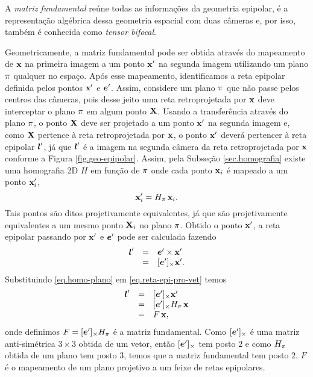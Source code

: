 A \textit{matriz fundamental} reúne todas as informações da geometria epipolar, é a representação algébrica dessa geometria espacial com duas câmeras e, por isso, também é conhecida como \textit{tensor bifocal}. 

Geometricamente, a matriz fundamental pode ser obtida através do mapeamento de $\mathbf{x}$ na primeira imagem a um ponto $\mathbf{x}'$ na segunda imagem utilizando um plano $\pi$ qualquer no espaço. Após esse mapeamento, identificamos a reta epipolar definida pelos pontos $\mathbf{x}'$ e $\boldsymbol{e}'$. Assim, considere um plano $\pi$ que não passe pelos centros das câmeras, pois desse jeito uma reta retroprojetada por $\mathbf{x}$ deve interceptar o plano $\pi$ em algum ponto $\mathbf{X}$. Usando a transferência através do plano $\pi$, o ponto $\mathbf{X}$ deve ser projetado a um ponto $\mathbf{x}'$ na segunda imagem e, como $\mathbf{X}$ pertence à reta retroprojetada por $\mathbf{x}$, o ponto $\mathbf{x}'$ deverá pertencer à reta epipolar $\boldsymbol{l}'$, já que $\boldsymbol{l}'$ é a imagem na segunda câmera da reta retroprojetada por $\mathbf{x}$ conforme a Figura \ref{fig.geo-epipolar}. Assim, pela Subseção \ref{sec.homografia} existe uma homografia 2D $H$ em função de $\pi$ onde cada ponto $\mathbf{x}_i$ é mapeado a um ponto $\mathbf{x}_i'$, 
\begin{equation}\label{eq.homo-plano}
\mathbf{x}'_i= H_{\pi} \,\mathbf{x}_i.
\end{equation}
Tais pontos são ditos projetivamente equivalentes, já que são projetivamente equivalentes a um mesmo ponto $\mathbf{X}_i$ no plano $\pi$. Obtido o ponto $\mathbf{x}'$, a reta epipolar passando por $\mathbf{x}'$ e $\boldsymbol{e}'$ pode ser calculada fazendo 
\begin{equation}\label{eq.reta-epi-pro-vet}
\begin{array}{rcl}
\boldsymbol{l}'&=&\boldsymbol{e}'\times\mathbf{x}'\\
&=&[\boldsymbol{e}']_\times\mathbf{x}'.
\end{array}
\end{equation}
Substituindo \ref{eq.homo-plano} em \ref{eq.reta-epi-pro-vet} temos
\begin{equation*}
\begin{array}{rcl}
\boldsymbol{l}'&=&[\boldsymbol{e}']_\times\mathbf{x}'\\
&=&[\boldsymbol{e}']_\times H_{\pi} \,\mathbf{x}\\
&=&F\,\mathbf{x},
\end{array}
\end{equation*} 
onde definimos $F=[\boldsymbol{e}']_\times H_{\pi}$ é a matriz fundamental. Como $[\boldsymbol{e}']_\times$ é uma matriz anti-simétrica $3\times3$ obtida de um vetor, então  $[\boldsymbol{e}']_\times$ tem posto $2$ e como $H_{\pi}$ obtida de um plano tem posto $3$, temos que a matriz fundamental tem posto $2$. $F$ é o mapeamento de um plano projetivo a um feixe de retas epipolares.


